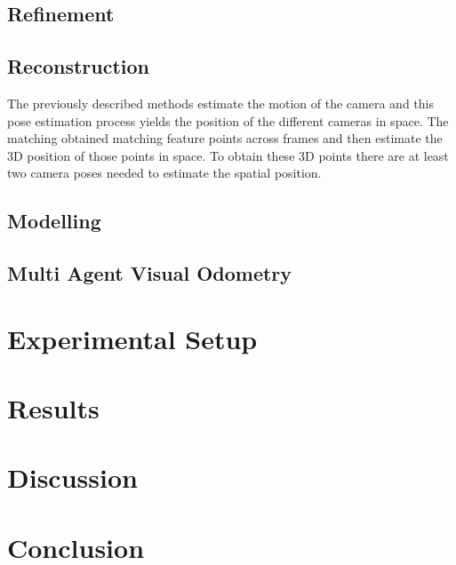 \documentclass[a4paper]{article}
\begin{document}
\subsection{Refinement}

\subsection{Reconstruction}
The previously described methods estimate the motion of the camera and this
pose estimation process yields the position of the different cameras in space.
The matching obtained matching feature points across frames and then estimate
the 3D position of those points in space. To obtain these 3D points there are
at least two camera poses needed to estimate the spatial position.

\subsection{Modelling}


\subsection{Multi Agent Visual Odometry}


\section{Experimental Setup}

\section{Results}

\section{Discussion}

\section{Conclusion}



\end{document}
